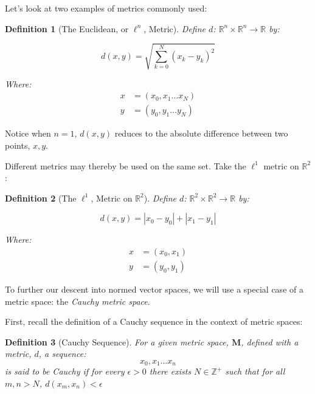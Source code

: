 \documentclass[12pt,a4paper]{report}
\theoremstyle{thms}
\theoremstyle{defns}
\newtheorem{definition}{Definition}[section]
\begin{document}
Let's look at two examples of metrics commonly used:

\begin{definition}[The Euclidean, or $\ell^n$, Metric]
    Define $d$: $\mathbb{R}^n \times \mathbb{R}^n \rightarrow \mathbb{R}$ by:

    \begin{equation}
        d(x, y) = \sqrt{\sum_{k=0}^{N} (x_k - y_k)^2}
    \end{equation}

    Where:
    \begin{align}
        x & = (x_0, x_1 \dots x_N) \\
        y & = (y_0, y_1 \dots y_N)
    \end{align}


\end{definition}

Notice when $n = 1$, $d(x, y)$ reduces to the absolute difference between two points, $x, y$.

Different metrics may thereby be used on the same set. Take the $\ell^1$ metric on $\mathbb{R}^2$:


\begin{definition}[The $\ell^1$, Metric on $\mathbb{R}^2$]
    Define $d$: $\mathbb{R}^2 \times \mathbb{R}^2 \rightarrow \mathbb{R}$ by:

    \begin{equation}
        d(x, y) = |x_0 - y_0| + |x_1 - y_1|
    \end{equation}

    Where:
    \begin{align}
        x & = (x_0, x_1) \\
        y & = (y_0, y_1)
    \end{align}
\end{definition}

To further our descent into normed vector spaces, we will use a special case of a metric space: the \textit{Cauchy metric space}.

First, recall the definition of a Cauchy sequence in the context of metric spaces:

\begin{definition}[Cauchy Sequence]
    For a given metric space, $\mathbf{M}$, defined with a metric, $d$, a sequence:
    \begin{equation}
        x_0, x_1 \dots x_n
    \end{equation}
    is said to be Cauchy if for every $\epsilon > 0$ there exists $N \in \mathbb{Z}^+$ such that for all $m, n > N$, $d(x_m, x_n) < \epsilon$
\end{definition}
\end{document}
